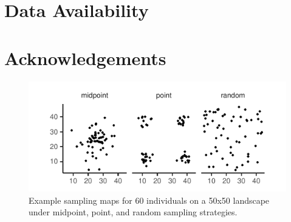 \documentclass[9pt,twocolumn,twoside,lineno]{gsajnl}
\begin{document}


\section{Data Availability}

\section{Acknowledgements}
\newpage
\newpage

\begin{figure}[htbp]
\includegraphics{sampling_maps.pdf}
\caption{Example sampling maps for 60 individuals on a 50x50 landscape under midpoint, point, and random sampling strategies.}
\label{fig:spectrum}
\end{figure}
\end{document}
